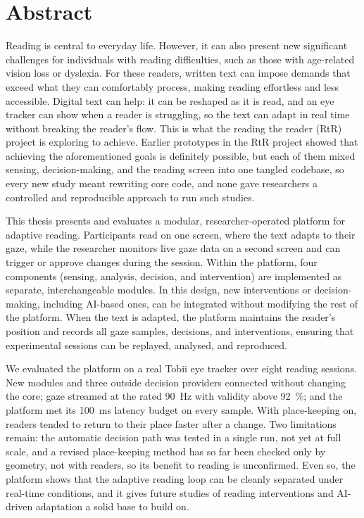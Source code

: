 \section*{Abstract}

Reading is central to everyday life. However, it can also present new significant challenges for individuals with reading difficulties, such as those with age-related vision loss or dyslexia. For these readers, written text can impose demands that exceed what they can comfortably process, making reading effortless and less accessible.
Digital text can help: it can be reshaped as it is read, and an eye tracker can show when a reader is struggling, so the text can adapt in real time without breaking the reader's flow. This is what the reading the reader (RtR) project is exploring to achieve.
Earlier prototypes in the RtR project showed that achieving the aforementioned goals is definitely possible, but each of them mixed sensing, decision-making, and the reading screen into one tangled codebase, so every new study meant rewriting core code, and none gave researchers a controlled and reproducible approach to run such studies.

This thesis presents and evaluates a modular, researcher-operated platform for adaptive reading.
Participants read on one screen, where the text adapts to their gaze, while the researcher monitors live gaze data on a second screen and can trigger or approve changes during the session.
Within the platform, four components (sensing, analysis, decision, and intervention) are implemented as separate, interchangeable modules. In this design, new interventions or decision-making, including AI-based ones, can be integrated without modifying the rest of the platform.
When the text is adapted, the platform maintains the reader's position and records all gaze samples, decisions, and interventions, ensuring that experimental sessions can be replayed, analysed, and reproduced.

We evaluated the platform on a real Tobii eye tracker over eight reading sessions.
New modules and three outside decision providers connected without changing the core; gaze streamed at the rated \SI{90}{\hertz} with validity above \SI{92}{\percent}; and the platform met its \SI{100}{\milli\second} latency budget on every sample.
With place-keeping on, readers tended to return to their place faster after a change.
Two limitations remain: the automatic decision path was tested in a single run, not yet at full scale, and a revised place-keeping method has so far been checked only by geometry, not with readers, so its benefit to reading is unconfirmed.
Even so, the platform shows that the adaptive reading loop can be cleanly separated under real-time conditions, and it gives future studies of reading interventions and AI-driven adaptation a solid base to build on.
